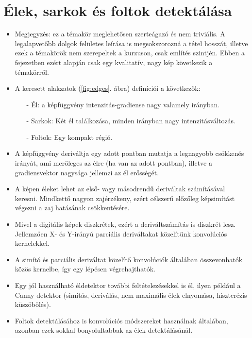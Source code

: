 \documentclass[12pt]{article}
\theoremstyle{plain}
\begin{document}
\section{Élek, sarkok és foltok detektálása}
\begin{itemize}
    \item Megjegyzés: ez a témakör meglehetősen szerteágazó és nem triviális. A legalapvetőbb dolgok felületes leírása is megsokszorozná a tétel hosszát, illetve ezek a témakörök nem szerepeltek a kurzuson, csak említés szintjén. Ebben a fejezetben ezért \cite{el} alapján csak egy kvalitatív, nagy kép következik a témakörről.

    \item A keresett alakzatok (\ref{fig:edges}. ábra) definíciói a következők:
    \begin{itemize}
        \item[-] Él: a képfüggvény intenzitás-gradiense nagy valamely irányban. 
        \item[-] Sarkok: Két él találkozása, minden irányban nagy intenzitásváltozás.
        \item[-] Foltok: Egy kompakt régió.
    \end{itemize}{}
    
    \item A képfüggvény deriváltja egy adott pontban mutatja a legnagyobb csökkenés irányát, ami merőleges az élre (ha van az adott pontban), illetve a gradiensvektor nagysága jellemzi az él erősségét.
    \item A képen éleket lehet az első- vagy másodrendű deriváltak számításával keresni. Mindkettő nagyon zajérzékeny, ezért célszerű előzőleg képsimítást végezni a zaj hatásának csökkentésére.
    \item Mivel a digitális képek diszkrétek, ezért a deriváltszámítás is diszkrét lesz. Jellemzően X- és Y-irányú parciális deriváltakat közelítünk konvolúciós kernelekkel.

    \item A simító és parciális deriváltat közelítő konvolúciók általában összevonhatók közös kernelbe, így egy lépésen végrehajthatók.

    \item Egy jól használható éldetektor további feltételezésekkel is él, ilyen például a Canny detektor (simítás, deriválás, nem maximális élek elnyomása, hiszterézis küszöbölés).
    
    \item Foltok detektálásához is konvolúciós módszereket használnak általában, azonban ezek sokkal bonyolultabbak az élek detektálásánál.
    
\end{itemize}{}
\end{document}
